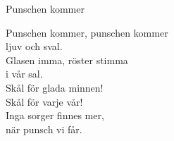 \begin{song}{Punschen kommer}

	
	Punschen kommer, punschen kommer\\
	ljuv och sval.\\
	Glasen imma, röster stimma\\
	i vår sal.\\
	Skål för glada minnen!\\
	Skål för varje vår!\\
	Inga sorger finnes mer,\\
	när punsch vi får.
	
\end{song}
